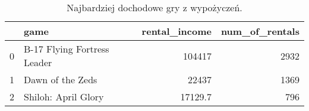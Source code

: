 \begin{table}[h]
\centering
\caption{Najbardziej dochodowe gry z wypożyczeń.}\label{tab:rentals}
\begin{tabular}{rlrr}
\hline
    & game                        &   rental\_income &   num\_of\_rentals \\
\hline
  0 & B-17 Flying Fortress Leader &        104417   &             2932 \\
  1 & Dawn of the Zeds            &         22437   &             1369 \\
  2 & Shiloh: April Glory         &         17129.7 &              796 \\
\hline
\end{tabular}\end{table}